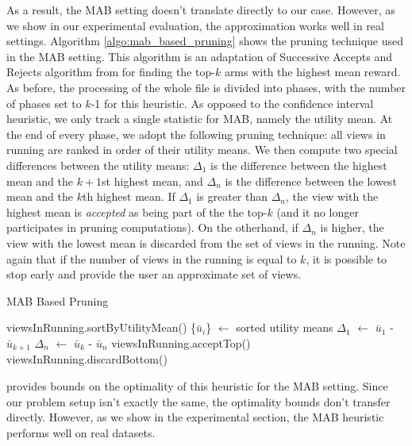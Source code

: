 As a result, the MAB setting doesn't translate directly to our case. 
However, as we show in our experimental evaluation, the approximation works well
in real settings.
Algorithm \ref{algo:mab_based_pruning} shows the pruning technique used in the
MAB setting.
This
algorithm is an adaptation of Successive Accepts and Rejects
algorithm from \cite{BubeckWV13} for finding the top-$k$ arms with the highest
mean reward.
As before, the processing of the whole file is divided into phases, with the
number of phases set to $k$-1 for this heuristic.
As opposed to the confidence interval heuristic, we only track a single
statistic for MAB, namely the utility mean.
At the end of every phase, we adopt the following pruning technique: all views
in running are ranked in order of their utility means. 
We then compute two special differences between the utility means: $\Delta_1$
is the difference between the highest mean and the $k+1$st highest mean, and
$\Delta_n$ is the difference between the lowest mean and the $k$th highest mean.
If $\Delta_1$ is greater than $\Delta_n$, the view with the highest mean is
{\it accepted} as being part of the the top-$k$ (and it no longer participates
in pruning computations).
On the otherhand, if $\Delta_n$ is higher, the view with the lowest mean is discarded
from the set of views in the running.
Note again that if the number of views in the running is equal to $k$, it is
possible to stop early and provide the user an approximate set of views.

\begin{algorithm}
\caption{MAB Based Pruning}
\label{algo:mab_based_pruning}
\begin{algorithmic}[1]
\State viewsInRunning.sortByUtilityMean()
\State \{$\bar{u}_{i}$\} $\gets$ sorted utility means
\State $\Delta_1$ $\gets$ $\bar{u}_{1}$ - $\bar{u}_{k+1}$
\State $\Delta_n$ $\gets$ $\bar{u}_{k}$ - $\bar{u}_{n}$
\State viewsInRunning.acceptTop()
\Else
\State viewsInRunning.discardBottom()
\EndIf
\end{algorithmic}
\end{algorithm}

\cite{BubeckWV13} provides bounds on the optimality of this heuristic for the
MAB setting.
Since our problem setup isn't exactly the same, the optimality bounds don't
transfer directly.
However, as we show in the experimental section, the MAB heuristic performs well
on real datasets.

